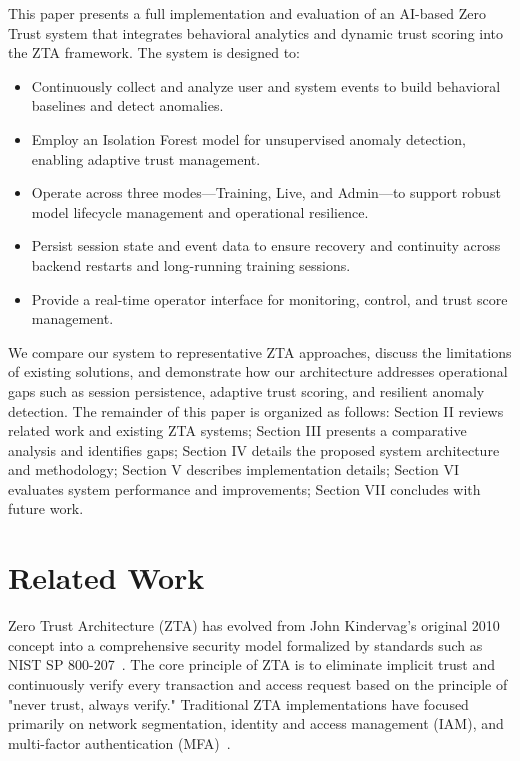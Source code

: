 \documentclass[conference]{IEEEtran}
\begin{document}
This paper presents a full implementation and evaluation of an AI-based Zero Trust system that integrates behavioral analytics and dynamic trust scoring into the ZTA framework. The system is designed to:
\begin{itemize}[leftmargin=*]
  \item Continuously collect and analyze user and system events to build behavioral baselines and detect anomalies.
  \item Employ an Isolation Forest model for unsupervised anomaly detection, enabling adaptive trust management.
  \item Operate across three modes—Training, Live, and Admin—to support robust model lifecycle management and operational resilience.
  \item Persist session state and event data to ensure recovery and continuity across backend restarts and long-running training sessions.
  \item Provide a real-time operator interface for monitoring, control, and trust score management.
\end{itemize}

We compare our system to representative ZTA approaches, discuss the limitations of existing solutions, and demonstrate how our architecture addresses operational gaps such as session persistence, adaptive trust scoring, and resilient anomaly detection. The remainder of this paper is organized as follows: Section II reviews related work and existing ZTA systems; Section III presents a comparative analysis and identifies gaps; Section IV details the proposed system architecture and methodology; Section V describes implementation details; Section VI evaluates system performance and improvements; Section VII concludes with future work.

\section{Related Work}
Zero Trust Architecture (ZTA) has evolved from John Kindervag's original 2010 concept into a comprehensive security model formalized by standards such as NIST SP 800-207~\cite{nist800207}. The core principle of ZTA is to eliminate implicit trust and continuously verify every transaction and access request based on the principle of "never trust, always verify." Traditional ZTA implementations have focused primarily on network segmentation, identity and access management (IAM), and multi-factor authentication (MFA)~\cite{rose2020zero}.
\end{document}

